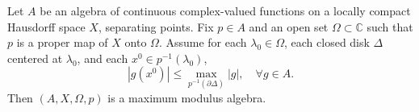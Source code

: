 
Let $A$ be an algebra of continuous complex-valued functions on a locally compact Hausdorff space $X$, separating points. Fix $p \in A$ and an open set $\Omega \subset \mathbb{C}$ such that $p$ is a proper map of $X$ onto $\Omega$. Assume for each $\lambda_0 \in \Omega$, each closed disk $\Delta$ centered at $\lambda_0$, and each $x^0 \in p^{-1}(\lambda_0)$,
$$|g(x^0)| \leq \max_{p^{-1}(\partial \Delta)} |g|, \quad \forall g \in A.$$
Then $(A, X, \Omega, p)$ is a maximum modulus algebra.
